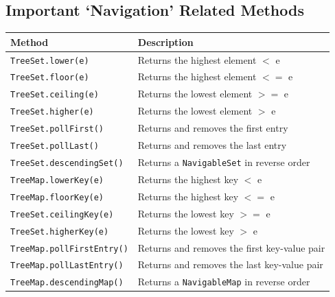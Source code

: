 \subsection{Important `Navigation' Related Methods}
\begin{center}
\begin{tabular}{ll}
    \textbf{Method} & \textbf{Description} \\
    \hline
    \verb#TreeSet.lower(e)# & Returns the highest element $<$ e \\
    \verb#TreeSet.floor(e)# & Returns the highest element $<=$ e \\
    \verb#TreeSet.ceiling(e)# & Returns the lowest element $>=$ e \\
    \verb#TreeSet.higher(e)# & Returns the lowest element $>$ e \\
    \verb#TreeSet.pollFirst()# & Returns and removes the first entry \\
    \verb#TreeSet.pollLast()# & Returns and removes the last entry \\
    \verb#TreeSet.descendingSet()# & Returns a \verb#NavigableSet# in reverse 
    order \\
    \hline
    \verb#TreeMap.lowerKey(e)# & Returns the highest key $<$ e \\
    \verb#TreeMap.floorKey(e)# & Returns the highest key $<=$ e \\
    \verb#TreeSet.ceilingKey(e)# & Returns the lowest key $>=$ e \\
    \verb#TreeSet.higherKey(e)# & Returns the lowest key $>$ e \\
    \verb#TreeMap.pollFirstEntry()# & Returns and removes the first key-value 
    pair \\
    \verb#TreeMap.pollLastEntry()# & Returns and removes the last key-value 
    pair \\
    \verb#TreeMap.descendingMap()# & Returns a \verb#NavigableMap# in reverse 
    order \\
\end{tabular}
\end{center}

